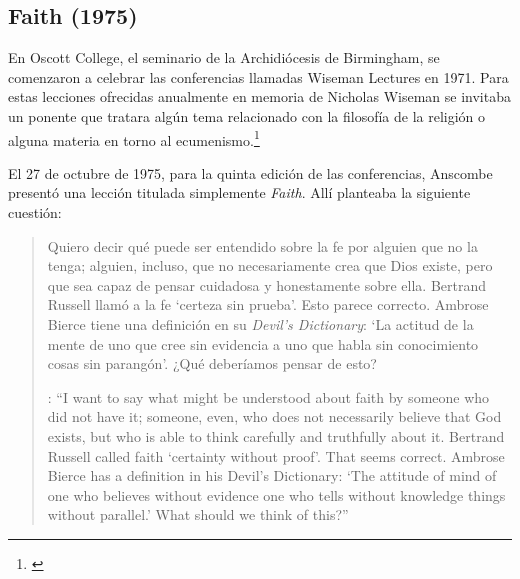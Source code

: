 \subsection{Faith (1975)}

En Oscott College, el seminario de la Archidiócesis de Birmingham, se comenzaron a celebrar las conferencias llamadas Wiseman Lectures en 1971. Para estas lecciones ofrecidas anualmente en memoria de Nicholas Wiseman se invitaba un ponente que tratara algún tema relacionado con la filosofía de la religión o alguna materia en torno al ecumenismo.\footnote{\cite[Cf.~][7]{wisemanlects}}

El 27 de octubre de 1975, para la quinta edición de las conferencias, Anscombe presentó una lección titulada simplemente \emph{Faith}. Allí planteaba la siguiente cuestión: \blockquote[{\cite[115]{anscombe1981erp:faith}}: \enquote{I want to say what might be understood about faith by someone who did not have it; someone, even, who does not necessarily believe that God exists, but who is able to think carefully and truthfully about it. Bertrand Russell called faith `certainty without proof'. That seems correct. Ambrose Bierce has a definition in his Devil's Dictionary: `The attitude of mind of one who believes without evidence one who tells without knowledge things without parallel.' What should we think of this?}]{Quiero decir qué puede ser entendido sobre la fe por alguien que no la tenga; alguien, incluso, que no necesariamente crea que Dios existe, pero que sea capaz de pensar cuidadosa y honestamente sobre ella. Bertrand Russell llamó a la fe `certeza sin prueba'. Esto parece correcto. Ambrose Bierce tiene una definición en su \emph{Devil's Dictionary}: `La actitud de la mente de uno que cree sin evidencia a uno que habla sin conocimiento cosas sin parangón'. ¿Qué deberíamos pensar de esto?}

